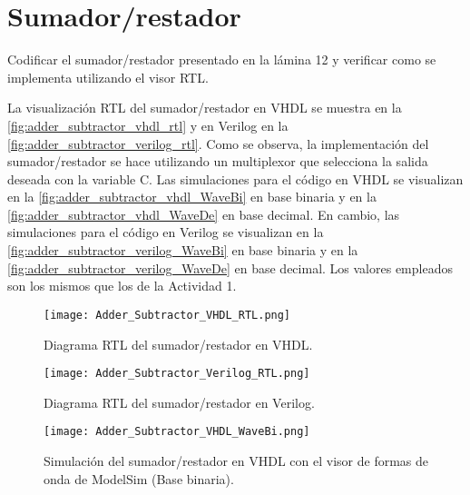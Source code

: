 \section{Sumador/restador \label{sec:s3}}

\begin{center}
	\begin{minipage}{12cm}
		\begin{tcolorbox}[title=Actividad 3]
			Codificar el sumador/restador presentado en la lámina 12 y verificar como se implementa utilizando el visor RTL.
		\end{tcolorbox}	
	\end{minipage}
\end{center}

La visualización RTL del sumador/restador en VHDL se muestra en la \autoref{fig:adder_subtractor_vhdl_rtl} y en Verilog en la \autoref{fig:adder_subtractor_verilog_rtl}. Como se observa, la implementación del sumador/restador se hace utilizando un multiplexor que selecciona la salida deseada con la variable C. Las simulaciones para el código en VHDL se visualizan en la \autoref{fig:adder_subtractor_vhdl_WaveBi} en base binaria y en la \autoref{fig:adder_subtractor_vhdl_WaveDe} en base decimal. En cambio, las simulaciones para el código en Verilog se visualizan en la \autoref{fig:adder_subtractor_verilog_WaveBi} en base binaria y en la \autoref{fig:adder_subtractor_verilog_WaveDe} en base decimal. Los valores empleados son los mismos que los de la Actividad 1.

\begin{figure}[ht]
	\centering
	\texttt{[image: Adder\_Subtractor\_VHDL\_RTL.png]}
	\caption{Diagrama RTL del sumador/restador en VHDL. \label{fig:adder_subtractor_vhdl_rtl}}
\end{figure}

\begin{figure}[ht]
	\centering
	\texttt{[image: Adder\_Subtractor\_Verilog\_RTL.png]}
	\caption{Diagrama RTL del sumador/restador en Verilog. \label{fig:adder_subtractor_verilog_rtl}}
\end{figure}

\begin{figure}[ht]
	\centering
	\texttt{[image: Adder\_Subtractor\_VHDL\_WaveBi.png]}
	\caption{Simulación del sumador/restador en VHDL con el visor de formas de onda de ModelSim (Base binaria). \label{fig:adder_subtractor_vhdl_WaveBi}}
\end{figure}

